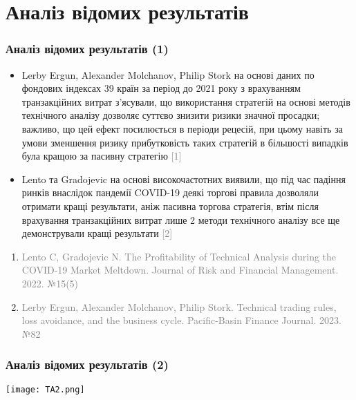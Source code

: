 \documentclass[aspectratio=169]{beamer}
\begin{document}
\section{Аналіз відомих результатів}
\begin{frame}
\frametitle{Аналіз відомих результатів (1)}
\begin{itemize}
\item Lerby Ergun, Alexander Molchanov, Philip Stork на основі даних по фондових індексах 39 країн за період до 2021 року з врахуванням транзакційних витрат з’ясували, що використання стратегій на основі методів технічного аналізу дозволяє суттєво знизити ризики значної просадки; важливо, що цей ефект посилюється в періоди рецесій, при цьому навіть за умови зменшення ризику прибутковість таких стратегій в більшості випадків була кращою за пасивну стратегію \textcolor{gray}{[1]}
\tinyskip
\item Lento та Gradojevic на основі високочастотних виявили, що під час падіння ринків внаслідок пандемії COVID-19 деякі торгові правила дозволяли отримати кращі результати, аніж пасивна торгова стратегія, втім після врахування транзакційних витрат лише 2 методи технічного аналізу все ще демонстрували кращі результати \textcolor{gray}{[2]}
\end{itemize}
\tinyskip
\scriptsize 
\begin{enumerate}
\scriptsize \item \textcolor{gray}{Lento C, Gradojevic N. The Profitability of Technical Analysis during the COVID-19 Market Meltdown. Journal of Risk and Financial Management. 2022. №15(5)} 
 \scriptsize\item \textcolor{gray}{Lerby Ergun, Alexander Molchanov, Philip Stork. Technical trading rules, loss avoidance, and the business cycle. Pacific-Basin Finance Journal. 2023. №82}
\end{enumerate}
\end{frame}

\begin{frame}
\frametitle{Аналіз відомих результатів (2)}
\begin{center}
\texttt{[image: TA2.png]}
\end{center}
\end{frame}
\end{document}
